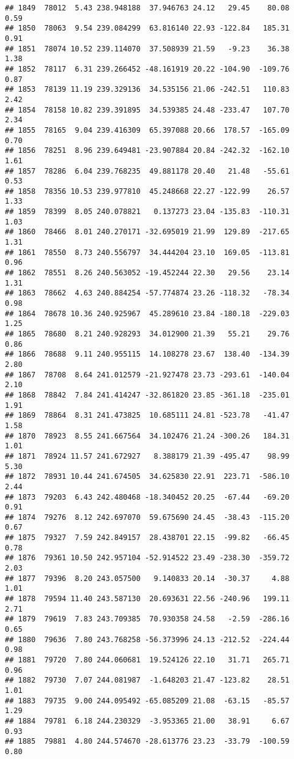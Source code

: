 \documentclass[]{article}
\begin{document}
\begin{verbatim}
## 1849  78012  5.43 238.948188  37.946763 24.12   29.45    80.08  0.59
## 1850  78063  9.54 239.084299  63.816140 22.93 -122.84   185.31  0.91
## 1851  78074 10.52 239.114070  37.508939 21.59   -9.23    36.38  1.38
## 1852  78117  6.31 239.266452 -48.161919 20.22 -104.90  -109.76  0.87
## 1853  78139 11.19 239.329136  34.535156 21.06 -242.51   110.83  2.42
## 1854  78158 10.82 239.391895  34.539385 24.48 -233.47   107.70  2.34
## 1855  78165  9.04 239.416309  65.397088 20.66  178.57  -165.09  0.70
## 1856  78251  8.96 239.649481 -23.907884 20.84 -242.32  -162.10  1.61
## 1857  78286  6.04 239.768235  49.881178 20.40   21.48   -55.61  0.53
## 1858  78356 10.53 239.977810  45.248668 22.27 -122.99    26.57  1.33
## 1859  78399  8.05 240.078821   0.137273 23.04 -135.83  -110.31  1.03
## 1860  78466  8.01 240.270171 -32.695019 21.99  129.89  -217.65  1.31
## 1861  78550  8.73 240.556797  34.444204 23.10  169.05  -113.81  0.96
## 1862  78551  8.26 240.563052 -19.452244 22.30   29.56    23.14  1.31
## 1863  78662  4.63 240.884254 -57.774874 23.26 -118.32   -78.34  0.98
## 1864  78678 10.36 240.925967  45.289610 23.84 -180.18  -229.03  1.25
## 1865  78680  8.21 240.928293  34.012900 21.39   55.21    29.76  0.86
## 1866  78688  9.11 240.955115  14.108278 23.67  138.40  -134.39  2.80
## 1867  78708  8.64 241.012579 -21.927478 23.73 -293.61  -140.04  2.10
## 1868  78842  7.84 241.414247 -32.861820 23.85 -361.18  -235.01  1.91
## 1869  78864  8.31 241.473825  10.685111 24.81 -523.78   -41.47  1.58
## 1870  78923  8.55 241.667564  34.102476 21.24 -300.26   184.31  1.01
## 1871  78924 11.57 241.672927   8.388179 21.39 -495.47    98.99  5.30
## 1872  78931 10.44 241.674505  34.625830 22.91  223.71  -586.10  2.44
## 1873  79203  6.43 242.480468 -18.340452 20.25  -67.44   -69.20  0.91
## 1874  79276  8.12 242.697070  59.675690 24.45  -38.43  -115.20  0.67
## 1875  79327  7.59 242.849157  28.438701 22.15  -99.82   -66.45  0.78
## 1876  79361 10.50 242.957104 -52.914522 23.49 -238.30  -359.72  2.03
## 1877  79396  8.20 243.057500   9.140833 20.14  -30.37     4.88  1.01
## 1878  79594 11.40 243.587130  20.693631 22.56 -240.96   199.11  2.71
## 1879  79619  7.83 243.709385  70.930358 24.58   -2.59  -286.16  0.65
## 1880  79636  7.80 243.768258 -56.373996 24.13 -212.52  -224.44  0.98
## 1881  79720  7.80 244.060681  19.524126 22.10   31.71   265.71  0.96
## 1882  79730  7.07 244.081987  -1.648203 21.47 -123.82    28.51  1.01
## 1883  79735  9.00 244.095492 -65.085209 21.08  -63.15   -85.57  1.29
## 1884  79781  6.18 244.230329  -3.953365 21.00   38.91     6.67  0.93
## 1885  79881  4.80 244.574670 -28.613776 23.23  -33.79  -100.59  0.80

\end{verbatim}
\end{document}
